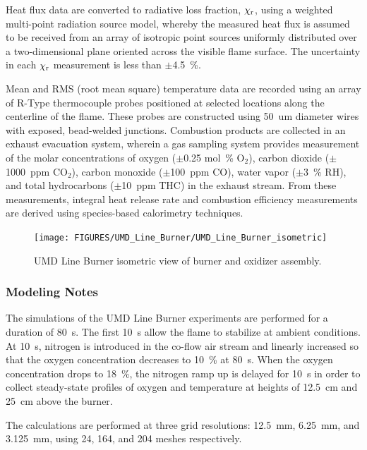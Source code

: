 Heat flux data are converted to radiative loss fraction, $\chi_{\rm r}$, using a weighted multi-point radiation source model, whereby the measured heat flux is assumed to be received from an array of isotropic point sources uniformly distributed over a two-dimensional plane oriented across the visible flame surface. The uncertainty in each $\chi_{\rm r}$ measurement is less than $\pm$4.5~\%.

Mean and RMS (root mean square) temperature data are recorded using an array of R-Type thermocouple probes positioned at selected locations along the centerline of the flame. These probes are constructed using 50~um diameter wires with exposed, bead-welded junctions. Combustion products are collected in an exhaust evacuation system, wherein a gas sampling system provides measurement of the molar concentrations of oxygen ($\pm$0.25 mol~\% O$_2$), carbon dioxide ($\pm$1000~ppm CO$_2$), carbon monoxide ($\pm$100~ppm CO), water vapor ($\pm$3~\% RH), and total hydrocarbons ($\pm$10~ppm THC) in the exhaust stream. From these measurements, integral heat release rate and combustion efficiency measurements are derived using species-based calorimetry techniques.

\begin{figure}[!ht]
\centering
\texttt{[image: FIGURES/UMD\_Line\_Burner/UMD\_Line\_Burner\_isometric]}
\caption[UMD Line Burner isometric view of burner and oxidizer assembly]{UMD Line Burner isometric view of burner and oxidizer assembly.}
\label{fig:umd_line_burner_plan_view}
\end{figure}

\subsubsection{Modeling Notes}

The simulations of the UMD Line Burner experiments are performed for a duration of 80~s. The first 10~s allow the flame to stabilize at ambient conditions. At 10~s, nitrogen is introduced in the co-flow air stream and linearly increased so that the oxygen concentration decreases to 10~\% at 80~s. When the oxygen concentration drops to 18~\%, the nitrogen ramp up is delayed for 10~s in order to collect steady-state profiles of oxygen and temperature at heights of 12.5~cm and 25~cm above the burner.

The calculations are performed at three grid resolutions: 12.5~mm, 6.25~mm, and 3.125~mm, using 24, 164, and 204 meshes respectively.

